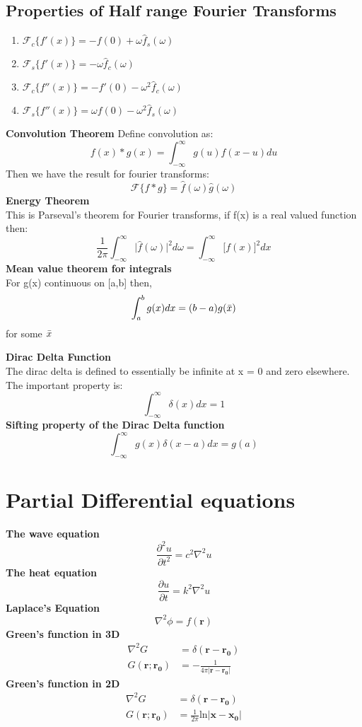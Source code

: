 \documentclass{article}
\newcommand{\f}{\mathcal{F}}
\begin{document}
\subsection{Properties of Half range Fourier Transforms}
\begin{enumerate}
    \item $\mathcal{F}_c \{f'(x) \} = -f(0) + \omega \hat{f}_s(\omega)$
    \item $\mathcal{F}_s \{f'(x) \} = - \omega \hat{f}_c(\omega)$ 
    \item $\mathcal{F}_c \{f''(x) \} = -f'(0) - \omega^2 \hat{f}_c(\omega)$
    \item $\mathcal{F}_s \{f''(x) \} = \omega f(0) - \omega^2 \hat{f}_s(\omega)$
\end{enumerate}
\textbf{Convolution Theorem}
Define convolution as:
$$
f(x) * g(x) = \int_{-\infty}^{\infty} g(u)f(x-u) du
$$
Then we have the result for fourier transforms:
$$
\f \{ f * g \} = \hat{f}(\omega)\hat{g}(\omega)
$$
\textbf{Energy Theorem} \\
This is Parseval's theorem for Fourier transforms, if f(x) is  a real valued function then:
$$
\frac{1}{2\pi} \int_{-\infty}^\infty \big | \hat{f}(\omega) \big |^2 d\omega = \int_{-\infty}^\infty \big [ f(x) \big ]^2 dx
$$
\textbf{Mean value theorem for integrals} \\
For g(x) continuous on [a,b] then,
$$
\int_a^b g(x) dx = (b-a) g(\Bar{x})
$$
for some $\Bar{x}$

\textbf{Dirac Delta Function} \\
The dirac delta is defined to essentially be infinite at x = 0 and zero elsewhere. The important property is:
$$
\int_{-\infty}^{\infty} \delta(x) dx = 1
$$
\textbf{Sifting property of the Dirac Delta function}
$$
\int_{-\infty}^{\infty} g(x) \delta(x - a) dx = g(a)
$$
\section{Partial Differential equations}

\textbf{The wave equation}
$$
\frac{\partial^2 u}{\partial t^2} = c^2 \nabla^2 u
$$
\textbf{The heat equation}
$$
\frac{\partial u}{\partial t} = k^2 \nabla^2 u
$$
\textbf{Laplace's Equation}
$$
\nabla^2 \phi = f(\mathbf{r})
$$
\textbf{Green's function in 3D}
\begin{align*}
    \nabla^2 G &= \delta(\mathbf{ r}- \mathbf{r_0}) \\
    G(\mathbf{r};\mathbf{r_0}) &= - \frac{1}{4\pi |\mathbf{r} - \mathbf{r_0}|}
\end{align*}
\textbf{Green's function in 2D}
\begin{align*}
    \nabla^2 G &= \delta(\mathbf{ r}- \mathbf{r_0}) \\
    G(\mathbf{r};\mathbf{r_0}) &= \frac{1}{2\pi}\text{ln}| \mathbf{x} - \mathbf{x_0}|
\end{align*}
\end{document}
